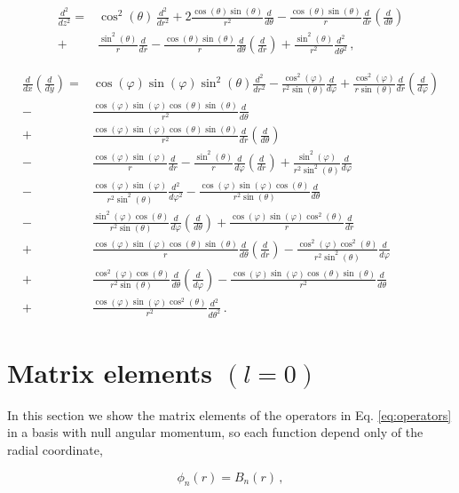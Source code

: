 \documentclass[12pt,a4paper]{article}
\newcommand{\dx}[1]{\frac{d{#1}}{dx}}
\newcommand{\dy}[1]{\frac{d{#1}}{dy}}
\newcommand{\ddz}[1]{\frac{d^2{#1}}{dz^2}}
\newcommand{\dr}[1]{\frac{d{#1}}{dr}}
\newcommand{\ddr}[1]{\frac{d^2{#1}}{dr^2}}
\newcommand{\dphi}[1]{\frac{d{#1}}{d\varphi}}
\newcommand{\ddphi}[1]{\frac{d^2{#1}}{d\varphi^2}}
\newcommand{\dt}[1]{\frac{d{#1}}{d\theta}}
\newcommand{\ddt}[1]{\frac{d^2{#1}}{d\theta^2}}
\newcommand{\cphi}{\cos(\varphi)}
\newcommand{\ccphi}{\cos^2(\varphi)}
\newcommand{\sphi}{\sin(\varphi)}
\newcommand{\ssphi}{\sin^2(\varphi)}
\newcommand{\ct}{\cos(\theta)}
\newcommand{\cct}{\cos^2(\theta)}
\newcommand{\st}{\sin(\theta)}
\newcommand{\sst}{\sin^2(\theta)}
\begin{document}
\begin{equation}\label{eq:d2z2}
\begin{split}
\ddz{} =& \cct\,\ddr{} + 2 \frac{\ct\st}{r^2}\dt{} - \frac{\ct\st}{r}\dr{}\left(\dt{}\right)\\
     +& \frac{\sst}{r}\dr{} - \frac{\ct\st}{r}\dt{}\left(\dr{}\right) + \frac{\sst}{r^2}\ddt{}\,,
\end{split}
\end{equation}


\begin{equation}\label{eq:dxdy}
\begin{split}
\dx{}\left(\dy{}\right) =& \cphi\sphi\sst\ddr{} - \frac{\ccphi}{r^2\st}\dphi{} + \frac{\ccphi}{r\st}\dr{}\left(\dphi{}\right) \\
                   -& \frac{\cphi\sphi\ct\st}{r^2}\dt{} \\
                   +& \frac{\cphi\sphi\ct\st}{r^2} \dr{}\left(\dt{}\right) \\
                   -& \frac{\cphi\sphi}{r}\dr{} - \frac{\sst}{r}\dphi{}\left(\dr{}\right) + \frac{\ssphi}{r^2\sst}\dphi{} \\
                   -& \frac{\cphi\sphi}{r^2\sst}\ddphi{} - \frac{\cphi\sphi\ct}{r^2\st}\dt{} \\
                   -& \frac{\ssphi\ct}{r^2\st}\dphi{}\left(\dt{}\right) + \frac{\cphi\sphi\cct}{r}\dr{} \\
                   +& \frac{\cphi\sphi\ct\st}{r}\dt{}\left(\dr{}\right) - \frac{\ccphi\cct}{r^2\sst}\dphi{} \\
                   +& \frac{\ccphi\ct}{r^2\st}\dt{}\left(\dphi{}\right) - \frac{\cphi\sphi\ct\st}{r^2}\dt{} \\
                   +& \frac{\cphi\sphi\cct}{r^2}\ddt{}\,.
\end{split}
\end{equation}

\section{Matrix elements $(l=0)$}

In this section we show the matrix elements of the operators in Eq. \ref{eq:operators} in a basis
with null angular momentum, so each function depend only of the radial coordinate,

\begin{equation}\label{eq:basis}
\phi_n(r) = B_n(r)\,,
\end{equation}
\end{document}

